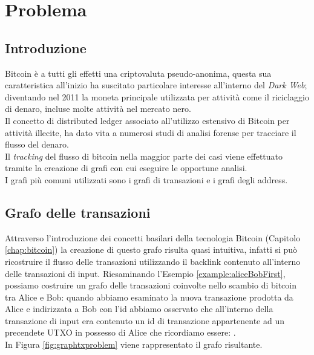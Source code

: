 \chapter{Problema}
\label{chap:problema}

\section{Introduzione} \label{sec:problemaIntroduzione}
Bitcoin è a tutti gli effetti una criptovaluta pseudo-anonima, questa sua caratteristica all’inizio ha suscitato particolare interesse all’interno del \emph{Dark Web}; diventando nel 2011 la moneta principale utilizzata per attività come il riciclaggio di denaro, incluse molte attività nel mercato nero. \\
Il concetto di distributed ledger associato all’utilizzo estensivo di Bitcoin per attività illecite, ha dato vita a numerosi studi di analisi forense per tracciare il flusso del denaro. \\
Il \emph{tracking} del flusso di bitcoin nella maggior parte dei casi viene effettuato tramite la creazione di grafi con cui eseguire le opportune analisi. \\
I grafi più comuni utilizzati sono i grafi di transazioni e i grafi degli address.

\section{Grafo delle transazioni} \label{sec:grafoDelleTransazioniProblema}
Attraverso l’introduzione dei concetti basilari della tecnologia Bitcoin (Capitolo \ref{chap:bitcoin}) la creazione di questo grafo risulta quasi intuitiva, infatti si può ricostruire il flusso delle transazioni utilizzando il backlink contenuto all’interno delle transazioni di input.
Riesaminando l’Esempio \ref{example:aliceBobFirst}, possiamo costruire un grafo delle transazioni coinvolte nello scambio di bitcoin tra Alice e Bob: quando abbiamo esaminato la nuova transazione prodotta da Alice e indirizzata a Bob con l’id  abbiamo osservato che all’interno della transazione di input era contenuto un id di transazione appartenente ad un precendete UTXO in possesso di Alice che ricordiamo essere: . \\ %
In Figura \ref{fig:graphtxproblem} viene rappresentato il grafo risultante.

